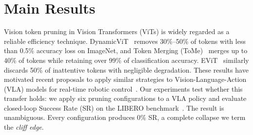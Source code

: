 
\section{Main Results}
\label{sec:results}

Vision token pruning in Vision Transformers (ViTs) is widely regarded as a reliable efficiency technique.
DynamicViT~\cite{rao2021dynamicvit} removes 30\%--50\% of tokens with less than 0.5\% accuracy loss on ImageNet, and Token Merging (ToMe)~\cite{bolya2023tome} merges up to 40\% of tokens while retaining over 99\% of classification accuracy.
EViT~\cite{liang2022evit} similarly discards 50\% of inattentive tokens with negligible degradation.
These results have motivated recent proposals to apply similar strategies to Vision-Language-Action (VLA) models for real-time robotic control~\cite{xu2025vlacache,cheng2026vlaiap}.
Our experiments test whether this transfer holds: we apply six pruning configurations to a VLA policy and evaluate closed-loop Success Rate (SR) on the LIBERO benchmark~\cite{liu2023libero}.
The result is unambiguous.
Every configuration produces 0\% SR, a complete collapse we term the \emph{cliff edge}.

